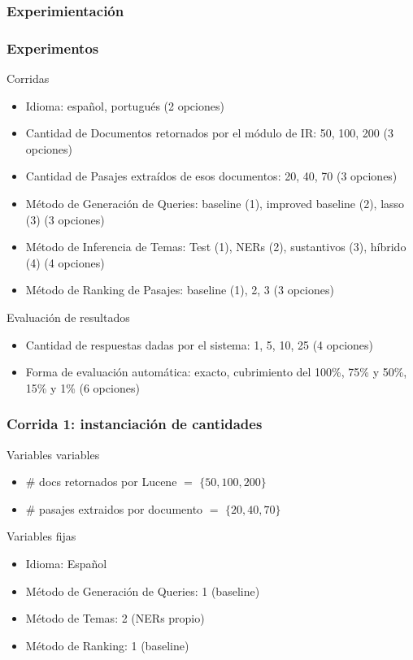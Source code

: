 \subsubsection*{Experimientación}
\begin{frame}
\frametitle{Experimentos}
Corridas
\begin{itemize}
  \item Idioma: español, portugués (2 opciones)
  \item Cantidad de Documentos retornados por el módulo de IR: 50, 100, 200 (3 opciones)
  \item Cantidad de Pasajes extraídos de esos documentos: 20, 40, 70 (3 opciones)
  \item Método de Generación de Queries: baseline (1), improved baseline (2), lasso (3) (3 opciones)
  \item Método de Inferencia de Temas: Test (1), NERs (2), sustantivos (3), híbrido (4) (4 opciones)
  \item Método de Ranking de Pasajes: baseline (1), 2, 3 (3 opciones)
\end{itemize}

Evaluación de resultados
\begin{itemize}
  \item Cantidad de respuestas dadas por el sistema: 1, 5, 10, 25 (4 opciones)
  \item Forma de evaluación automática: exacto, cubrimiento del 100\%, 75\% y 50\%, 15\%  y 1\% (6 opciones)
\end{itemize}
\end{frame}

\begin{frame}
\frametitle{Corrida 1: instanciación de cantidades}

Variables variables
\begin{itemize}
  \item \# docs retornados por Lucene $=$ $\{50, 100, 200\}$
  \item \# pasajes extraidos por documento $=$ $\{20, 40, 70\}$
\end{itemize}

Variables fijas
\begin{itemize}
  \item Idioma: Español
  \item Método de Generación de Queries: 1 (baseline)
  \item Método de Temas: 2 (NERs propio)
  \item Método de Ranking: 1 (baseline)
\end{itemize}

\end{frame}

